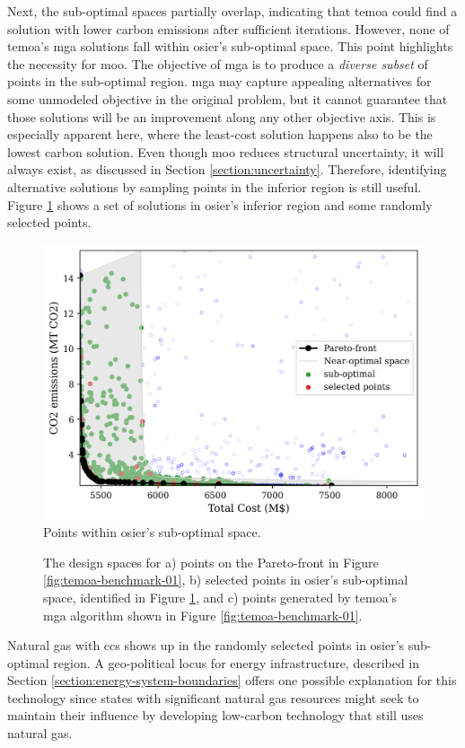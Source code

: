 Next, the sub-optimal spaces partially overlap, indicating that \ac{temoa} could 
find a solution with lower carbon emissions after sufficient iterations. However,
none of \ac{temoa}'s \ac{mga} solutions fall within \ac{osier}'s sub-optimal space.
This point highlights the necessity for \acl{moo}. The objective of \ac{mga} is to 
produce a \textit{diverse subset} of points in the sub-optimal region. \ac{mga} 
may capture appealing alternatives for some unmodeled objective in the original 
problem, but it cannot guarantee that those solutions will be an improvement along 
any other objective axis. This is especially apparent here, where the least-cost 
solution happens also to be the lowest carbon solution. Even though \ac{moo} reduces structural uncertainty, it will always exist, as discussed in 
Section \ref{section:uncertainty}. Therefore, identifying alternative solutions by sampling points in the inferior region is still useful. Figure \ref{fig:temoa-benchmark-02} shows a set of solutions in \ac{osier}'s inferior region and some
randomly selected points.



\begin{figure}[h]
  \centering
  \includegraphics[width=0.6\columnwidth]{figures/results/osier_mga_subset_01.png}
  \caption{Points within \ac{osier}'s sub-optimal space.}
  \label{fig:temoa-benchmark-02}
\end{figure}


\begin{figure}[h]
  \centering
  \resizebox{\columnwidth}{!}{}
  \caption{The design spaces for a) points on the Pareto-front in Figure \ref{fig:temoa-benchmark-01}, b) selected points in \ac{osier}'s sub-optimal space, identified in Figure \ref{fig:temoa-benchmark-02}, and c) points generated by \ac{temoa}'s \ac{mga} algorithm shown in Figure \ref{fig:temoa-benchmark-01}.}
  \label{fig:temoa-benchmark-03}
\end{figure}

Natural gas with \ac{ccs} shows up in the randomly selected points in \ac{osier}'s
sub-optimal region. A geo-political locus for energy infrastructure, described in
Section \ref{section:energy-system-boundaries} offers one possible explanation for this technology since states with significant natural gas resources might seek to 
maintain their influence by developing low-carbon technology that still uses
natural gas.